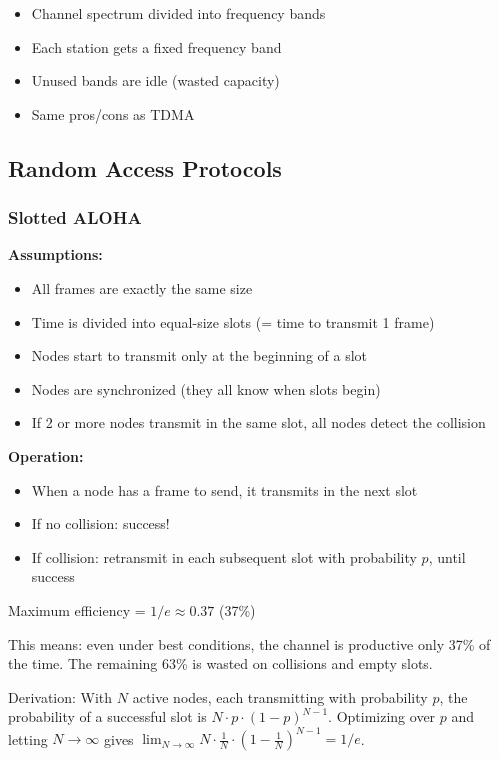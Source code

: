 \begin{keybox}
\begin{itemize}[noitemsep]
    \item Channel spectrum divided into frequency bands
    \item Each station gets a fixed frequency band
    \item Unused bands are idle (wasted capacity)
    \item Same pros/cons as TDMA
\end{itemize}
\end{keybox}

\subsection{Random Access Protocols}

\subsubsection{Slotted ALOHA}

\begin{keybox}
\textbf{Assumptions:}
\begin{itemize}[noitemsep]
    \item All frames are exactly the same size
    \item Time is divided into equal-size slots (= time to transmit 1 frame)
    \item Nodes start to transmit only at the beginning of a slot
    \item Nodes are synchronized (they all know when slots begin)
    \item If 2 or more nodes transmit in the same slot, all nodes detect the collision
\end{itemize}

\textbf{Operation:}
\begin{itemize}[noitemsep]
    \item When a node has a frame to send, it transmits in the next slot
    \item If no collision: success!
    \item If collision: retransmit in each subsequent slot with probability $p$, until success
\end{itemize}
\end{keybox}

\begin{formulabox}
Maximum efficiency = $1/e \approx 0.37$ (37\%)

This means: even under best conditions, the channel is productive only 37\% of the time. The remaining 63\% is wasted on collisions and empty slots.

\medskip
Derivation: With $N$ active nodes, each transmitting with probability $p$, the probability of a successful slot is $N \cdot p \cdot (1-p)^{N-1}$. Optimizing over $p$ and letting $N \to \infty$ gives $\lim_{N\to\infty} N \cdot \frac{1}{N} \cdot (1 - \frac{1}{N})^{N-1} = 1/e$.
\end{formulabox}

